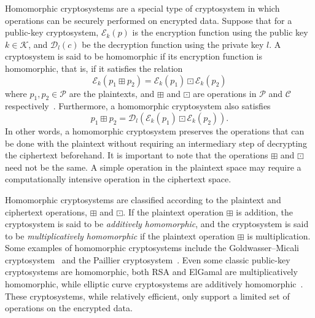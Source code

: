 Homomorphic cryptosystems are a special type of cryptosystem in which operations can be securely performed on encrypted data. Suppose that for a public-key cryptosystem, $\mathcal{E}_k \left(p \right)$ is the encryption function using the public key $k \in \mathcal{K}$, and $\mathcal{D}_l \left(c \right)$ be the decryption function using the private key $l$. A cryptosystem is said to be homomorphic if its encryption function is homomorphic, that is, if it satisfies the relation
\begin{equation}
    \mathcal{E}_k \left(p_1 \boxplus p_2\right) = \mathcal{E}_k \left(p_1\right) \boxdot \mathcal{E}_k \left(p_2\right)
\end{equation}
where $p_1, p_2 \in \mathcal{P}$ are the plaintexts, and $\boxplus$ and $\boxdot$ are operations in $\mathcal{P}$ and $\mathcal{C}$ respectively~\cite{fontaine_survey_2007}. Furthermore, a homomorphic cryptosystem also satisfies~\cite{li_elliptic_2012}
\begin{equation}
    p_1 \boxplus p_2 = \mathcal{D}_l \left( \mathcal{E}_k \left(p_1\right) \boxdot \mathcal{E}_k \left(p_2\right) \right).
\end{equation}
In other words, a homomorphic cryptosystem preserves the operations that can be done with the plaintext without requiring an intermediary step of decrypting the ciphertext beforehand. It is important to note that the operations $\boxplus$ and $\boxdot$ need not be the same. A simple operation in the plaintext space may require a computationally intensive operation in the ciphertext space.

Homomorphic cryptosystems are classified according to the plaintext and ciphertext operations, $\boxplus$ and $\boxdot$. If the plaintext operation $\boxplus$ is addition, the cryptosystem is said to be \textit{additively homomorphic}, and the cryptosystem is said to be \textit{multiplicatively homomorphic} if the plaintext operation $\boxplus$ is multiplication. Some examples of homomorphic cryptosystems include the Goldwasser--Micali cryptosystem~\cite{goldwasser_probabilistic_1984} and the Paillier cryptosystem~\cite{stern_public-key_1999}. Even some classic public-key cryptosystems are homomorphic, both RSA and ElGamal are multiplicatively homomorphic, while elliptic curve cryptosystems are additively homomorphic~\cite{li_elliptic_2012}. These cryptosystems, while relatively efficient, only support a limited set of operations on the encrypted data.


